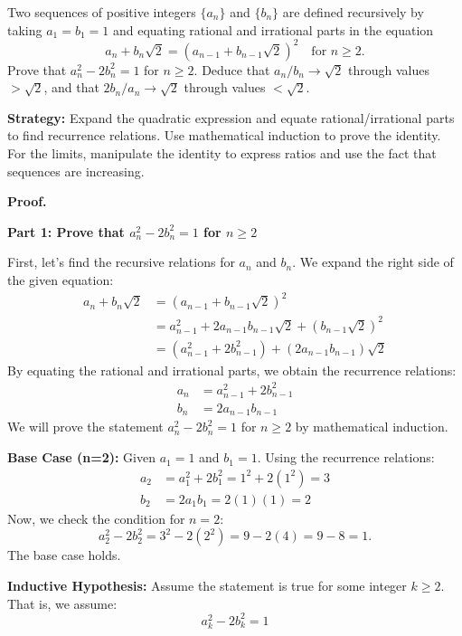 \begin{problembox}
Two sequences of positive integers $\{a_n\}$ and $\{b_n\}$ are defined recursively by taking $a_1 = b_1 = 1$ and equating rational and irrational parts in the equation
\[a_n + b_n \sqrt{2} = (a_{n-1} + b_{n-1} \sqrt{2})^2 \quad \text{for } n \geq 2.\]
Prove that $a_n^2 - 2b_n^2 = 1$ for $n \geq 2$. Deduce that $a_n/b_n \to \sqrt{2}$ through values $> \sqrt{2}$, and that $2b_n/a_n \to \sqrt{2}$ through values $< \sqrt{2}$.
\end{problembox}

\noindent\textbf{Strategy:} Expand the quadratic expression and equate rational/irrational parts to find recurrence relations. Use mathematical induction to prove the identity. For the limits, manipulate the identity to express ratios and use the fact that sequences are increasing.

\noindent\textbf{Proof.}

\textbf{Part 1: Prove that $a_n^2 - 2b_n^2 = 1$ for $n \geq 2$}

First, let's find the recursive relations for $a_n$ and $b_n$. We expand the right side of the given equation:
\begin{align*}
a_n + b_n \sqrt{2} &= (a_{n-1} + b_{n-1} \sqrt{2})^2 \\
&= a_{n-1}^2 + 2a_{n-1}b_{n-1}\sqrt{2} + (b_{n-1}\sqrt{2})^2 \\
&= (a_{n-1}^2 + 2b_{n-1}^2) + (2a_{n-1}b_{n-1})\sqrt{2}
\end{align*}
By equating the rational and irrational parts, we obtain the recurrence relations:
\begin{align}
a_n &= a_{n-1}^2 + 2b_{n-1}^2 \label{eq:an} \\
b_n &= 2a_{n-1}b_{n-1} \label{eq:bn}
\end{align}
We will prove the statement $a_n^2 - 2b_n^2 = 1$ for $n \geq 2$ by mathematical induction.

\textbf{Base Case (n=2):}
Given $a_1 = 1$ and $b_1 = 1$. Using the recurrence relations:
\begin{align*}
a_2 &= a_1^2 + 2b_1^2 = 1^2 + 2(1^2) = 3 \\
b_2 &= 2a_1b_1 = 2(1)(1) = 2
\end{align*}
Now, we check the condition for $n=2$:
\[ a_2^2 - 2b_2^2 = 3^2 - 2(2^2) = 9 - 2(4) = 9 - 8 = 1. \]
The base case holds.

\textbf{Inductive Hypothesis:}
Assume the statement is true for some integer $k \geq 2$. That is, we assume:
\[ a_k^2 - 2b_k^2 = 1 \]

